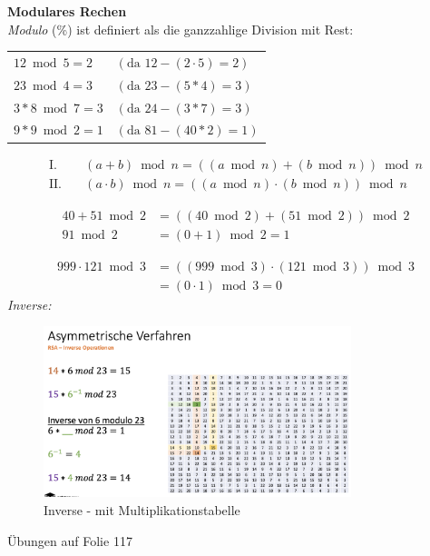 \documentclass[a4paper,12pt]{article}
\begin{document}
\begin{tcolorbox}[title=Modulares Rechen, colback=blue!5!white, colframe=blue!75!black]
\noindent\textbf{Modulares Rechen}\\
\textit{Modulo} (\%) ist definiert als die ganzzahlige Division mit Rest: 
\begin{table}[H]
    \centering
    \begin{tabular}{l|l}
        $12 \bmod 5 = 2$ & $(\text{da } 12 - (2 \cdot 5) = 2)$ \\
        $23 \bmod 4 = 3$ & $(\text{da } 23 - (5 * 4) = 3)$ \\
        $3 * 8 \bmod 7 = 3$ & $(\text{da } 24 - (3 * 7) = 3)$ \\
        $9 * 9 \bmod 2 = 1$ & $(\text{da } 81 - (40 * 2) = 1)$ \\
    \end{tabular}
\end{table}

\begin{align*}
    \text{I.} \quad &(a + b) \bmod n = ((a \bmod n) + (b \bmod n)) \bmod n \\
    \text{II.} \quad &(a \cdot b) \bmod n = ((a \bmod n) \cdot (b \bmod n)) \bmod n
    \end{align*}

    \begin{align*}
    40 + 51 \bmod 2 &= ((40 \bmod 2) + (51 \bmod 2)) \bmod 2 \\
    91 \bmod 2 &= (0 + 1) \bmod 2 = 1
    \end{align*}
    
    \begin{align*}
    999 \cdot 121 \bmod 3 &= ((999 \bmod 3) \cdot (121 \bmod 3)) \bmod 3 \\
    &= (0 \cdot 1) \bmod 3 = 0
    \end{align*}
\vspace*{1em}
\textit{Inverse:}
\begin{figure}[H]
    \centering
    \includegraphics[width=0.8\textwidth]{bilder/inverse.png}
    \caption{Inverse - mit Multiplikationstabelle}
    \label{fig:inverse}
\end{figure}
Übungen auf Folie 117
\end{tcolorbox}
\end{document}
